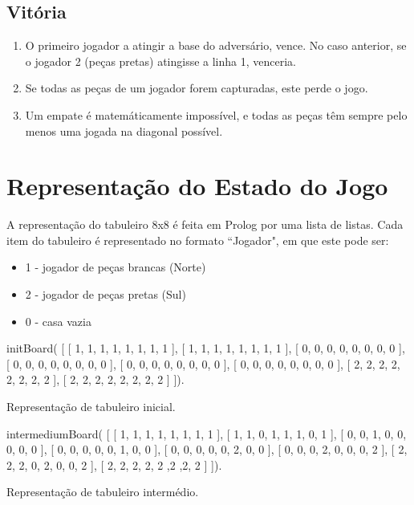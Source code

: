 \documentclass[15pt,a4paper]{article}
\begin{document}
\subsection{Vitória}
\begin{enumerate}
\item O primeiro jogador a atingir a base do adversário, vence. No caso anterior, se o jogador 2 (peças pretas) atingisse a linha 1, venceria.
\item Se todas as peças de um jogador forem capturadas, este perde o jogo.
\item Um empate é matemáticamente impossível, e todas as peças têm sempre pelo menos uma jogada na diagonal possível.
\end{enumerate}


 
\section{Representação do Estado do Jogo}

A representação do tabuleiro 8x8 é feita em Prolog por uma lista de listas.
Cada item do tabuleiro é representado no formato ``Jogador", em que este pode ser:
\begin{itemize}
\item 1 - jogador de peças brancas (Norte)
\item 2 - jogador de peças pretas (Sul)
\item 0 - casa vazia
\end{itemize}

\begin{code}[H]
	\begin{verbatimtab}
initBoard(
	[
		[ 1, 1, 1, 1, 1, 1, 1, 1 ],
		[ 1, 1, 1, 1, 1, 1, 1, 1 ],
		[ 0, 0, 0, 0, 0, 0, 0, 0 ],
		[ 0, 0, 0, 0, 0, 0, 0, 0 ],
		[ 0, 0, 0, 0, 0, 0, 0, 0 ],
		[ 0, 0, 0, 0, 0, 0, 0, 0 ],
		[ 2, 2, 2, 2, 2, 2, 2, 2 ],
		[ 2, 2, 2, 2, 2, 2, 2, 2 ]
	]).
\end{verbatimtab}
\caption{Representação de tabuleiro inicial.}
\end{code}


\begin{code}[H]
	\begin{verbatimtab}

intermediumBoard(
	[
		[ 1, 1, 1, 1, 1, 1, 1, 1 ],
		[ 1, 1, 0, 1, 1, 1, 0, 1 ],
		[ 0, 0, 1, 0, 0, 0, 0, 0 ],
		[ 0, 0, 0, 0, 0, 1, 0, 0 ],
		[ 0, 0, 0, 0, 0, 2, 0, 0 ],
		[ 0, 0, 0, 2, 0, 0, 0, 2 ],
		[ 2, 2, 2, 0, 2, 0, 0, 2 ],
		[ 2, 2, 2, 2, 2 ,2 ,2, 2 ]
	]).
\end{verbatimtab}
\caption{Representação de tabuleiro intermédio.}
\end{code}
\end{document}
